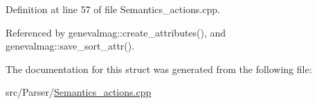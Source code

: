 Definition at line 57 of file Semantics\_\-actions.cpp.



Referenced by genevalmag::create\_\-attributes(), and genevalmag::save\_\-sort\_\-attr().



The documentation for this struct was generated from the following file:\begin{DoxyCompactItemize}
\item 
src/Parser/\hyperlink{Semantics__actions_8cpp}{Semantics\_\-actions.cpp}\end{DoxyCompactItemize}
